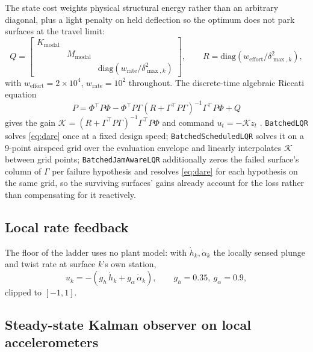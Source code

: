 \documentclass[preprint,11pt,authoryear]{elsarticle}
\begin{document}
The state cost weights physical structural energy rather than an arbitrary
diagonal, plus a light penalty on held deflection so the optimum does not park
surfaces at the travel limit:
\begin{equation}
Q = \begin{bmatrix} K_{\mathrm{modal}} & & \\ & M_{\mathrm{modal}} & \\ & & \mathrm{diag}\!\left(w_{\mathrm{rate}}/\delta_{\max,k}^2\right) \end{bmatrix},
\qquad
R = \mathrm{diag}\!\left(w_{\mathrm{effort}}/\delta_{\max,k}^2\right),
\label{eq:lqrcost}
\end{equation}
with $w_{\mathrm{effort}}=2{\times}10^4$, $w_{\mathrm{rate}}=10^2$ throughout.
The discrete-time algebraic Riccati equation
\begin{equation}
P = \Phi^{\!\top} P \Phi - \Phi^{\!\top} P \Gamma \left(R+\Gamma^{\!\top} P \Gamma\right)^{-1} \Gamma^{\!\top} P \Phi + Q
\label{eq:dare}
\end{equation}
gives the gain $\mathcal{K}=(R+\Gamma^{\!\top} P \Gamma)^{-1}\Gamma^{\!\top} P \Phi$
and command $u_t=-\mathcal{K} z_t$ \citep{anderson2007optimal}.
\texttt{BatchedLQR} solves \eqref{eq:dare} once at a fixed design speed;
\texttt{BatchedScheduledLQR} solves it on a \SI{9}{}-point airspeed grid over
the evaluation envelope and linearly interpolates $\mathcal{K}$ between grid
points; \texttt{BatchedJamAwareLQR} additionally zeros the failed surface's
column of $\Gamma$ per failure hypothesis and resolves \eqref{eq:dare} for each
hypothesis on the same grid, so the surviving surfaces' gains already account
for the loss rather than compensating for it reactively.

\subsection{Local rate feedback}

The floor of the ladder uses no plant model: with $\dot h_k,\dot\alpha_k$ the
locally sensed plunge and twist rate at surface $k$'s own station,
\begin{equation}
u_k = -\left(g_h\,\dot h_k + g_\alpha\,\dot\alpha_k\right), \qquad g_h=0.35,\ g_\alpha=0.9,
\label{eq:ratefeedback}
\end{equation}
clipped to $[-1,1]$.

\subsection{Steady-state Kalman observer on local accelerometers}
\end{document}
